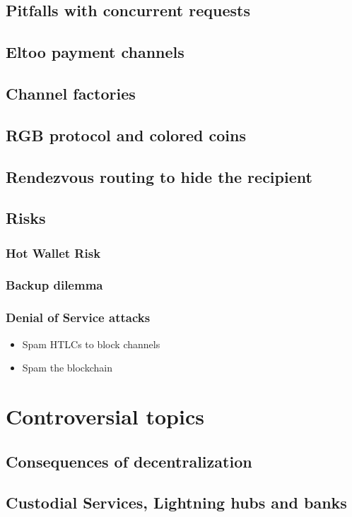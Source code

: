 \documentclass[a4paper,12pt,oneside,openany]{book}
\begin{document}
\section{Pitfalls with concurrent requests}
\section{Eltoo payment channels}
\section{Channel factories}
\section{RGB protocol and colored coins}
\section{Rendezvous routing to hide the recipient}
\section{Risks}
\subsection{Hot Wallet Risk}
\subsection{Backup dilemma}
\subsection{Denial of Service attacks}
\begin{itemize}
\item Spam HTLCs to block channels
\item Spam the blockchain
\end{itemize}
\chapter{Controversial topics}
\section{Consequences of decentralization}
\section{Custodial Services, Lightning hubs and banks}
\end{document}
